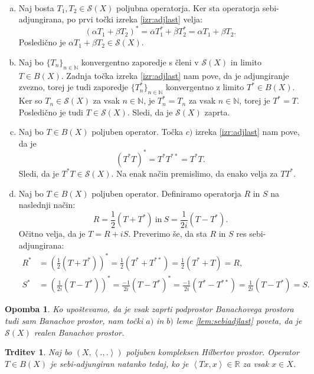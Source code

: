 \documentclass[12pt,a4paper,oneside,fleqn,openany]{book}
\newtheorem{trditev}[izrek]{Trditev}
\newtheorem{opomba}[izrek]{Opomba}
\newcommand{\eopf}{\raisebox{0.8ex}{\framebox{}}} %
\newenvironment{dokaz}%
{\noindent{\bf Dokaz.}\ }%
{\hfill\eopf\par\bigskip}%
\newcommand{\R}{\mathbb{R}}
\newcommand{\N}{\mathbb{N}}
\newcommand{\Sp}[2]{\ensuremath{\left<#1, #2\right>}}
\begin{document}
\begin{dokaz}
	\begin{enumerate}[a)]
		\item Naj bosta $T_1, T_2 \in \mathcal{S}(X)$ poljubna operatorja. Ker sta operatorja sebi-adjungirana, po prvi točki izreka \ref{izr:adjlast} velja: $$(\alpha T_1 + \beta T_2)^* = \overline{\alpha} T_1^* + \overline{\beta} T_2^* = \alpha T_1 + \beta T_2.$$ Posledično je $\alpha T_1 + \beta T_2 \in \mathcal{S}(X)$.
		
		\item Naj bo $\{T_n\}_{n\in\N}$ konvergentno zaporedje s členi v $\mathcal{S}(X)$ in limito $T\in B(X)$. Zadnja točka izreka \ref{izr:adjlast} nam pove, da je adjungiranje zvezno, torej je tudi zaporedje $\{T_n^*\}_{n\in\N}$ konvergentno z limito $T^* \in B(X)$. Ker so $T_n \in \mathcal{S}(X)$ za vsak $n\in \N$, je $T_n^* = T_n$ za vsak $n\in \N$, torej je $T^* = T$. Posledično je tudi $T\in \mathcal{S}(X)$. Sledi, da je $\mathcal{S}(X)$ zaprta.
		
		\item Naj bo $T\in B(X)$ poljuben operator. Točka $c)$ izreka \ref{izr:adjlast} nam pove, da je $$(T^*T)^* = T^*T^{**} = T^*T.$$ Sledi, da je $T^*T\in \mathcal{S}(X)$. Na enak način premislimo, da enako velja za $TT^*$.
		
		\item Naj bo $T\in B(X)$ poljuben operator. Definiramo operatorja $R$ in $S$ na naslednji način: $$R = \frac{1}{2}(T + T^*)~\text{in}~ S=\frac{1}{2i}(T - T^*).$$
		Očitno velja, da je $T = R + iS$. Preverimo še, da sta $R$ in $S$ res sebi-adjungirana:
		\begin{align*}
			R^* &= (\frac{1}{2}(T + T^*))^* = \frac{1}{2}(T^* + T^{**}) = \frac{1}{2}(T^* + T) = R, \\
			S^* &= (\frac{1}{2i}(T - T^*))^* = \frac{-1}{2i}(T - T^*)^* = \frac{-1}{2i}(T^* - T^{**}) =\frac{1}{2i}(T - T^*) = S.
		\end{align*}
	\end{enumerate}
\end{dokaz}

\begin{opomba}
	\label{opomb:sebiadjlast}
	Ko upoštevamo, da je vsak zaprti podprostor Banachovega prostora tudi sam Banachov prostor, nam točki $a)$ in $b)$ leme \ref{lem:sebiadjlast} poveta, da je $\mathcal{S}(X)$ realen Banachov prostor.
\end{opomba}

\begin{trditev}
	\label{trd:sebiadjop}
	Naj bo $(X, \Sp{.}{.})$ poljuben kompleksen Hilbertov prostor. Operator $T\in B(X)$ je sebi-adjungiran natanko tedaj, ko je $\Sp{Tx}{x}\in\R$ za vsak $x\in X$.
\end{trditev}
\end{document}
